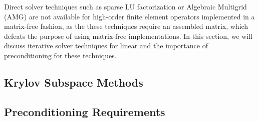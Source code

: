 Direct solver techniques such as sparse LU factorization or Algebraic Multigrid (AMG) are not available for high-order finite element operators implemented in a matrix-free fashion, as the these techniques require an assembled matrix, which defeats the purpose of using matrix-free implementations.
In this section, we will discuss iterative solver techniques for linear and the importance of preconditioning for these techniques.

\subsection{Krylov Subspace Methods}


\subsection{Preconditioning Requirements}

